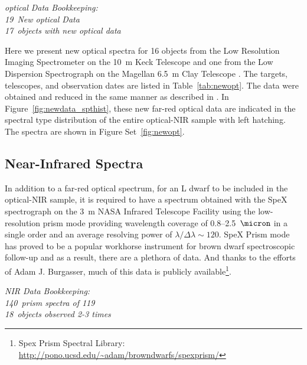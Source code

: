 \documentclass[12pt,preprint]{aastex}
\newcommand{\newoptSpectra}{19} %
\newcommand{\newoptObjects}{17} %
\newcommand{\prismspectra}{140} %
\newcommand{\dupes}{18} %
\newcommand{\objects}{119} %
\begin{document}
\label{sec:obs_new_opt}

\emph{optical Data Bookkeeping: \\
\newoptSpectra~New optical Data\\
\newoptObjects~objects with new optical data\\}

Here we present new optical spectra for 16 objects from the Low Resolution Imaging Spectrometer on the 10~m Keck Telescope \citep[LRIS]{LRIS} and one from the Low Dispersion Spectrograph on the Magellan 6.5~m Clay Telescope \citep[LDSS-3]{LDSS2}.
The targets, telescopes, and observation dates are listed in Table~\ref{tab:newopt}. 
The data were obtained and reduced in the same manner as described in \citet{Kirkpatrick10}. 
In Figure~\ref{fig:newdata_spthist}, these new far-red optical data are indicated in the spectral type distribution of the entire optical-NIR sample with left hatching.
The spectra are shown in Figure Set~\ref{fig:newopt}.

\subsection{Near-Infrared Spectra}

In addition to a far-red optical spectrum, for an L dwarf to be included in the optical-NIR sample, it is required to have a spectrum obtained with the SpeX spectrograph \citep{Spex} on the 3~m NASA Infrared Telescope Facility using the low-resolution prism mode providing wavelength coverage of 0.8--2.5~$\micron$ in a single order and an average resolving power of $\lambda/\Delta\lambda\sim120$.
SpeX Prism mode has proved to be a popular workhorse instrument for brown dwarf spectroscopic follow-up and as a result, there are a plethora of data. And thanks to the efforts of Adam J. Burgasser, much of this data is publicly available\footnote{Spex Prism Spectral Library: \url{http://pono.ucsd.edu/~adam/browndwarfs/spexprism/}}. 

\label{sec:obs_new_nir}

\emph{NIR Data Bookkeeping: \\
\prismspectra~prism spectra of \objects \\
\dupes~objects observed 2-3 times}
\end{document}
